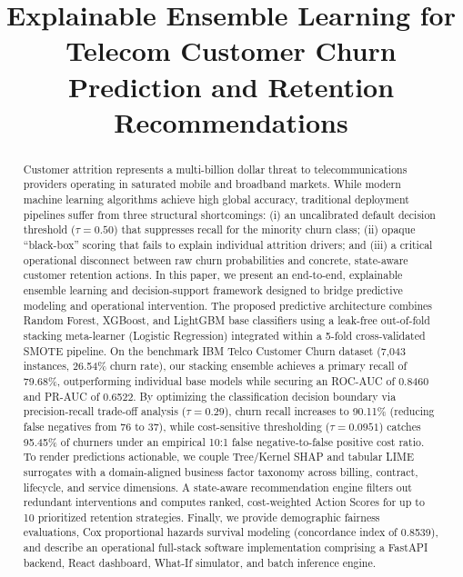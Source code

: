 \documentclass[conference]{IEEEtran}
\begin{document}
\title{Explainable Ensemble Learning for Telecom Customer Churn Prediction and Retention Recommendations}

\author{
}

\maketitle

\begin{abstract}
Customer attrition represents a multi-billion dollar threat to telecommunications providers operating in saturated mobile and broadband markets. While modern machine learning algorithms achieve high global accuracy, traditional deployment pipelines suffer from three structural shortcomings: (i) an uncalibrated default decision threshold ($\tau=0.50$) that suppresses recall for the minority churn class; (ii) opaque ``black-box'' scoring that fails to explain individual attrition drivers; and (iii) a critical operational disconnect between raw churn probabilities and concrete, state-aware customer retention actions. In this paper, we present an end-to-end, explainable ensemble learning and decision-support framework designed to bridge predictive modeling and operational intervention. The proposed predictive architecture combines Random Forest, XGBoost, and LightGBM base classifiers using a leak-free out-of-fold stacking meta-learner (Logistic Regression) integrated within a 5-fold cross-validated SMOTE pipeline. On the benchmark IBM Telco Customer Churn dataset (7,043 instances, 26.54\% churn rate), our stacking ensemble achieves a primary recall of 79.68\%, outperforming individual base models while securing an ROC-AUC of 0.8460 and PR-AUC of 0.6522. By optimizing the classification decision boundary via precision-recall trade-off analysis ($\tau=0.29$), churn recall increases to 90.11\% (reducing false negatives from 76 to 37), while cost-sensitive thresholding ($\tau=0.0951$) catches 95.45\% of churners under an empirical 10:1 false negative-to-false positive cost ratio. To render predictions actionable, we couple Tree/Kernel SHAP and tabular LIME surrogates with a domain-aligned business factor taxonomy across billing, contract, lifecycle, and service dimensions. A state-aware recommendation engine filters out redundant interventions and computes ranked, cost-weighted Action Scores for up to 10 prioritized retention strategies. Finally, we provide demographic fairness evaluations, Cox proportional hazards survival modeling (concordance index of 0.8539), and describe an operational full-stack software implementation comprising a FastAPI backend, React dashboard, What-If simulator, and batch inference engine.
\end{abstract}
\end{document}
